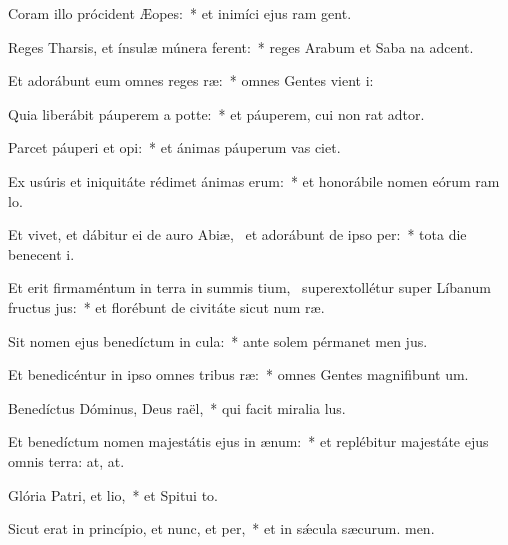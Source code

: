 \item Coram illo prócident Æopes:~* et inimíci ejus ram gent.
\item Reges Tharsis, et ínsulæ múnera ferent:~* reges Arabum et Saba na adcent.
\item Et adorábunt eum omnes reges ræ:~* omnes Gentes vient i:
\item Quia liberábit páuperem a potte:~* et páuperem, cui non rat adtor.
\item Parcet páuperi et opi:~* et ánimas páuperum vas ciet.
\item Ex usúris et iniquitáte rédimet ánimas erum:~* et honorábile nomen eórum ram lo.
\item Et vivet, et dábitur ei de auro Abiæ,~\pscross{} et adorábunt de ipso per:~* tota die benecent i.
\item Et erit firmaméntum in terra in summis tium,~\pscross{} superextollétur super Líbanum fructus jus:~* et florébunt de civitáte sicut num ræ.
\item Sit nomen ejus benedíctum in cula:~* ante solem pérmanet men jus.
\item Et benedicéntur in ipso omnes tribus ræ:~* omnes Gentes magnifibunt um.
\item Benedíctus Dóminus, Deus raël,~* qui facit miralia lus.
\item Et benedíctum nomen majestátis ejus in ænum:~* et replébitur majestáte ejus omnis terra: at, at.
\item Glória Patri, et lio,~* et Spitui to.
\item Sicut erat in princípio, et nunc, et per,~* et in sǽcula sæcurum. men.
